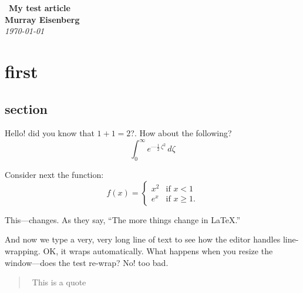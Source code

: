 \documentclass[11pt]{article}
\begin{document}
\begin{center}
 \textbf{\Large My test article}
\\
\textbf{Murray Eisenberg}
\\
\textit{\today}
\end{center}

\section{first}
\subsection{section}
Hello!
did you know that $1+1 = 2$?. How about the following?
\[
\int_0^{\infty}e^{—\frac{1}{2}\,\zeta^2}\,d\zeta
\]


Consider next the function:
\begin{equation*}
f(x) =
\begin{cases}
x^2 &\text{if $x < 1$}
\\
e^x &\text{if $x \geq 1$.}
\end{cases}
\end{equation*}

This---changes. As they say, ``The more things change in \LaTeX.''

And now we type a very, very long line of text to see how the editor handles line-wrapping.
OK, it wraps automatically. What happens when you resize the window—does
the test re-wrap? No! too bad.

\begin{quote}
 This is a quote
\end{quote}
\end{document}
